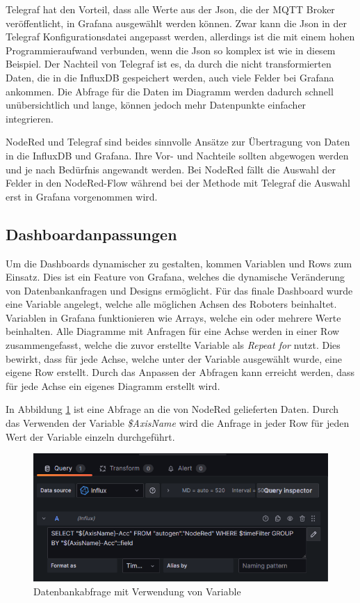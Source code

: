 \documentclass[a4paper, 12pt, oneside, toc=listofnumbered, bibliography=totoc]{scrbook}
\begin{document}
		Telegraf hat den Vorteil, dass alle Werte aus der Json, die der MQTT Broker veröffentlicht, in Grafana ausgewählt werden können. Zwar kann die Json in der Telegraf Konfigurationsdatei angepasst werden, allerdings ist die mit einem hohen Programmieraufwand verbunden, wenn die Json so komplex ist wie in diesem Beispiel. Der Nachteil von Telegraf ist es, da durch die nicht transformierten Daten, die in die InfluxDB gespeichert werden, auch viele Felder bei Grafana ankommen. Die Abfrage für die Daten im Diagramm werden dadurch schnell unübersichtlich und lange, können jedoch mehr Datenpunkte einfacher integrieren.
		
		NodeRed und Telegraf sind beides sinnvolle Ansätze zur Übertragung von Daten in die InfluxDB und Grafana. Ihre Vor- und Nachteile sollten abgewogen werden und je nach Bedürfnis angewandt werden. Bei NodeRed fällt die Auswahl der Felder in den NodeRed-Flow während bei der Methode mit Telegraf die Auswahl erst in Grafana vorgenommen wird.
		
		\subsection{Dashboardanpassungen}
		
		Um die Dashboards dynamischer zu gestalten, kommen Variablen und Rows zum Einsatz. Dies ist ein Feature von Grafana, welches die dynamische Veränderung von Datenbankanfragen und Designs ermöglicht. Für das finale Dashboard wurde eine Variable angelegt, welche alle möglichen Achsen des Roboters beinhaltet. Variablen in Grafana funktionieren wie Arrays, welche ein oder mehrere Werte beinhalten. Alle Diagramme mit Anfragen für eine Achse werden in einer Row zusammengefasst, welche die zuvor erstellte Variable als \textit{Repeat for} nutzt. Dies bewirkt, dass für jede Achse, welche unter der Variable ausgewählt wurde, eine eigene Row erstellt. Durch das Anpassen der Abfragen kann erreicht werden, dass für jede Achse ein eigenes Diagramm erstellt wird.
		
		In Abbildung \ref{fig:variables} ist eine Abfrage an die von NodeRed gelieferten Daten. Durch das Verwenden der Variable \textit{\${AxisName}} wird die Anfrage in jeder Row für jeden Wert der Variable einzeln durchgeführt.
		
		\begin{figure}[H]
			\centering
			\includegraphics[width=0.9\linewidth]{res/variables.png}
			\caption{Datenbankabfrage mit Verwendung von Variable}
			\label{fig:variables}
		\end{figure}
			
\end{document}
